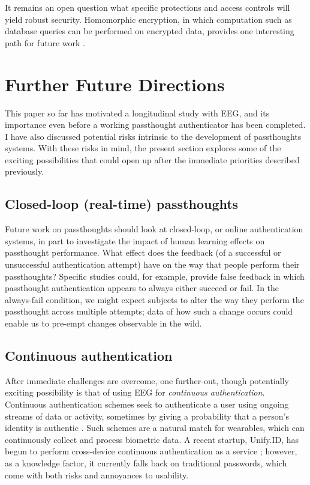 \documentclass[sigconf]{acmart}
\begin{document}
It remains an open question what specific protections and access controls will yield robust security.
Homomorphic encryption, in which computation such as database queries can be performed on encrypted data, provides one interesting path for future work \cite{Tu2013}.

\section{Further Future Directions}
\label{sec:org3b9b6f1}

This paper so far has motivated a longitudinal study with EEG, and its importance even before a working passthought authenticator has been completed. 
I have also discussed potential risks intrinsic to the development of passthoughts systems.
With these risks in mind, the present section explores some of the exciting possibilities that could open up after the immediate priorities described previously.

\subsection{Closed-loop (real-time) passthoughts}
\label{sec:orgc566ce1}
Future work on passthoughts should look at closed-loop, or online authentication systems,
in part to investigate the impact of human learning effects on passthought performance.
What effect does the feedback (of a successful or unsuccessful authentication attempt) have on the way that people perform their passthoughts?
Specific studies could, for example, provide false feedback in which passthought authentication appears to always either succeed or fail. In the always-fail condition, we might expect subjects to alter the way they perform the passthought across multiple attempts; data of how such a change occurs could enable us to pre-empt changes observable in the wild.

\subsection{Continuous authentication}
\label{sec:orge366961}

After immediate challenges are overcome,
one further-out, though potentially exciting possibility is that of using EEG for \emph{continuous authentication}.
Continuous authentication schemes seek to authenticate a user using ongoing streams of data or activity, sometimes by giving a probability that a person's identity is authentic \cite{Bojinov2012}.
Such schemes are a natural match for wearables, which can continuously collect and process biometric data.
A recent startup, Unify.ID, has begun to perform cross-device continuous authentication as a service \cite{UnifyID2017};
however, as a knowledge factor, it currently falls back on traditional passwords, which come with both risks and annoyances to usability.
\end{document}
